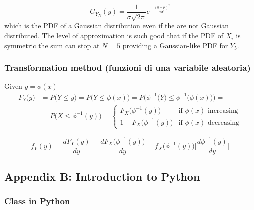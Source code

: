 \[G_{Y_{N}}(y)=\frac{1}{\sigma \sqrt{2\pi}}e^{-\frac{(y-\mu)^2}{2\sigma^2}}\]
which is the PDF of a Gaussian distribution even if the  are not Gaussian distributed.
The level of approximation is such good that if the PDF of $X_{i}$ is symmetric the sum can stop at $N=5$ providing a Gaussian-like PDF for $Y_{5}$. 

\subsubsection{Transformation method (funzioni di una variabile aleatoria)}
Given $ y=\phi(x) $
\begin{equation}
    \begin{split}
           F_{Y}\Big(y\Big)&=P\Big(Y\leq y\Big)=P\Big(Y\leq \phi(x)\Big)=P\Big(\phi^{-1}\big(Y\big) \leq \phi^{-1}\big(\phi(x)\big)\Big)=\\ &= P\Big(X \leq \phi^{-1}(y)\Big)=
           \begin{cases} F_{X}\Big(\phi^{-1}(y)\Big) & \mbox{if } \phi(x) \mbox{ increasing} \\ 1 - F_{X}\Big(\phi^{-1}(y)\Big) & \mbox{if } \phi(x) \mbox{ decreasing} \end{cases} 
    \end{split}
\end{equation}


\[f_{Y}(y)=\frac{dF_{Y}(y)}{dy}=\frac{dF_{X}\Big(\phi^{-1}(y)\Big)}{dy}=f_{X}\Big(\phi^{-1}(y)\Big) \Bigg| \frac{d\phi^{-1}(y)}{dy}\Bigg|\]

\subsection{Appendix B: Introduction to Python}
\subsubsection{Class in Python}